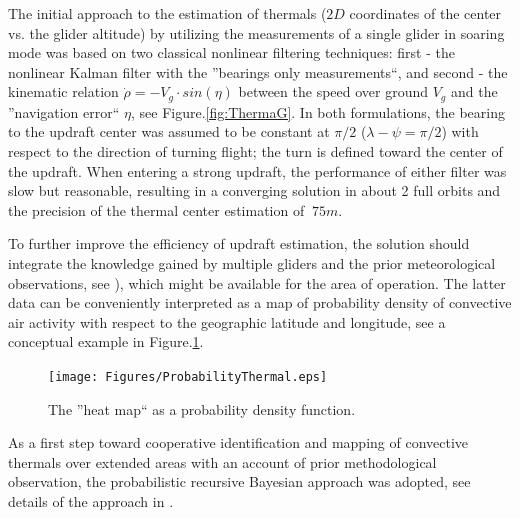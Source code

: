 \documentclass[letterpaper, 10 pt, conference]{ieeeconf}  %
\begin{document}
The initial approach to the estimation of thermals ($2D$ coordinates of the center vs. the glider altitude) by utilizing the measurements of a single glider in soaring mode was based on two classical nonlinear filtering techniques: first - the nonlinear Kalman filter with the ''bearings only measurements``, and second - the kinematic relation $\dot{\rho}=-V_g\cdot sin(\eta)$ between the speed over ground $V_g$ and the ''navigation error`` $\eta$, see Figure.\ref{fig:ThermaG}. In both formulations, the bearing to the updraft center was assumed to be constant at $\pi/2$ ($\lambda-\psi=\pi/2$) with respect to the direction of turning flight; the turn is defined toward the center of the updraft. When entering a strong updraft, the performance of either filter was slow but reasonable, resulting in a converging solution in about 2 full orbits and the precision of the thermal center estimation of $~75m$.

To further improve the efficiency of updraft estimation, the solution should integrate the knowledge gained by multiple gliders and the prior meteorological observations, see \cite{Pennycuick:1998,Hindman:2007}), which might be available for the area of operation. The latter data can be conveniently interpreted as a map of probability density of convective air activity with respect to the geographic latitude and longitude, see a conceptual example in Figure.\ref{fig:HeatMap}.
\begin{figure}[thpb]
  \centering
  \texttt{[image: Figures/ProbabilityThermal.eps]}
  \caption{The ''heat map`` as a probability density function.}
  \label{fig:HeatMap}
\end{figure}
As a first step toward cooperative identification and mapping of convective thermals over extended areas with an account of prior methodological observation, the probabilistic recursive Bayesian approach was adopted, see details of the approach in \cite{Bergman:1999}.
\end{document}

